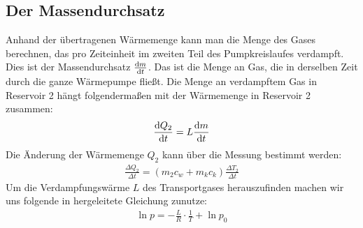 \subsection{Der Massendurchsatz \cite[vgl.][]{man:v206}}
Anhand der übertragenen Wärmemenge kann man die Menge des Gases berechnen, das pro Zeiteinheit
im zweiten Teil des Pumpkreislaufes verdampft.
Dies ist der Massendurchsatz $\frac{\mathop{}\!\mathrm{d} m}{\mathop{}\!\mathrm{d} t}$.
Das ist die Menge an Gas, die in derselben Zeit durch die ganze Wärmepumpe fließt.
Die Menge an verdampftem Gas in Reservoir 2 hängt folgendermaßen mit der Wärmemenge in Reservoir 2 zusammen:
\begin{align}
    \frac{\mathop{}\!\mathrm{d} Q_2}{\mathop{}\!\mathrm{d} t} = L \frac{\mathop{}\!\mathrm{d} m}{\mathop{}\!\mathrm{d} t}
    \label{eq:massedurchsatz}
\end{align} 
Die Änderung der Wärmemenge $ Q_2$ kann über die Messung bestimmt werden:
\begin{align}
    \frac{\Delta Q_2}{\Delta t} = (m_2 c_w + m_k c_k) \frac{\Delta T_2}{\Delta t}
    \label{eq:aenderung_q2}
\end{align} 
Um die Verdampfungswärme $L$ des Transportgases herauszufinden machen wir uns folgende in \cite[][5]{man:v203} hergeleitete
Gleichung zunutze:
\begin{align}
    \ln{p} = -\frac{L}{R}\cdot \frac{1}{T} + \ln{p_0}
    \label{eq:Dampfdruckkurve}
\end{align}

